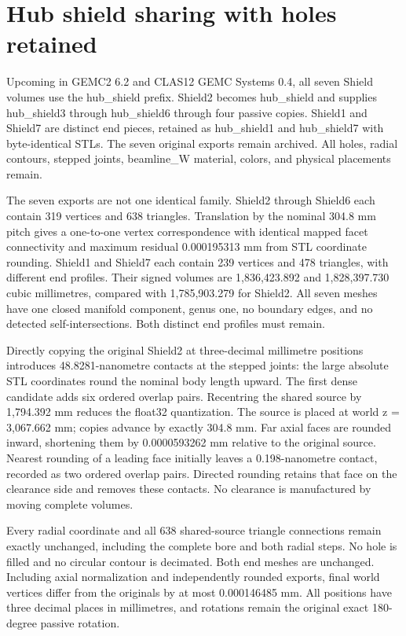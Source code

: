 \FloatBarrier
\section{Hub shield sharing with holes retained}
\label{sec:hub-shields}

Upcoming in GEMC2 6.2 and CLAS12 GEMC Systems 0.4, all seven Shield volumes use the hub\_shield prefix.
Shield2 becomes hub\_shield and supplies hub\_shield3 through hub\_shield6 through four passive copies.
Shield1 and Shield7 are distinct end pieces, retained as hub\_shield1 and hub\_shield7 with byte-identical
STLs. The seven original exports remain archived. All holes, radial contours, stepped joints, beamline\_W
material, colors, and physical placements remain.

The seven exports are not one identical family. Shield2 through Shield6 each contain 319 vertices and 638
triangles. Translation by the nominal 304.8 mm pitch gives a one-to-one vertex correspondence with identical
mapped facet connectivity and maximum residual 0.000195313 mm from STL coordinate rounding. Shield1 and
Shield7 each contain 239 vertices and 478 triangles, with different end profiles. Their signed volumes are
1,836,423.892 and 1,828,397.730 cubic millimetres, compared with 1,785,903.279 for Shield2. All seven meshes
have one closed manifold component, genus one, no boundary edges, and no detected self-intersections. Both
distinct end profiles must remain.

Directly copying the original Shield2 at three-decimal millimetre positions introduces 48.8281-nanometre
contacts at the stepped joints: the large absolute STL coordinates round the nominal body length upward. The
first dense candidate adds six ordered overlap pairs. Recentring the shared source by 1,794.392 mm reduces the
float32 quantization. The source is placed at world z = 3,067.662 mm; copies advance by exactly 304.8 mm. Far
axial faces are rounded inward, shortening them by 0.0000593262 mm relative to the original source. Nearest
rounding of a leading face initially leaves a 0.198-nanometre contact, recorded as two ordered overlap pairs.
Directed rounding retains that face on the clearance side and removes these contacts. No clearance is
manufactured by moving complete volumes.

Every radial coordinate and all 638 shared-source triangle connections remain exactly unchanged, including the
complete bore and both radial steps. No hole is filled and no circular contour is decimated. Both end meshes
are unchanged. Including axial normalization and independently rounded exports, final world vertices differ
from the originals by at most 0.000146485 mm. All positions have three decimal places in millimetres, and
rotations remain the original exact 180-degree passive rotation.

